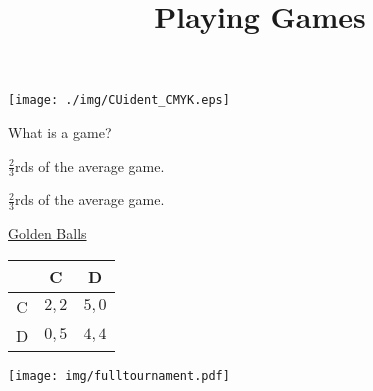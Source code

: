 \documentclass{beamer}
\title{Playing Games}
\date{}
\begin{document}
\begin{frame}
    \maketitle
	\begin{center}
		\texttt{[image: ./img/CUident\_CMYK.eps]}
	\end{center}
\end{frame}

\begin{frame}
    \begin{center}
        What is a game?
    \end{center}
\end{frame}

\begin{frame}
    \begin{center}
        \(\frac{2}{3}\)rds of the average game.
    \end{center}
\end{frame}

\begin{frame}
\end{frame}

\begin{frame}
    \begin{center}
        \(\frac{2}{3}\)rds of the average game.
    \end{center}
\end{frame}

\begin{frame}
    \begin{center}
        \href{https://www.youtube.com/watch?v=p3Uos2fzIJ0}{Golden Balls}
    \end{center}
\end{frame}

\begin{frame}
    \begin{center}
        \Huge
        \begin{tabular}{|c|c|c|}
            \hline
                   & C        & D        \\
            \hline
            C      & \(2, 2\) & \(5, 0\) \\
            \hline
            D      & \(0, 5\) & \(4, 4\) \\
            \hline
        \end{tabular}
    \end{center}
\end{frame}

\begin{frame}
    \begin{center}
        \texttt{[image: img/fulltournament.pdf]}
    \end{center}
\end{frame}
\end{document}
